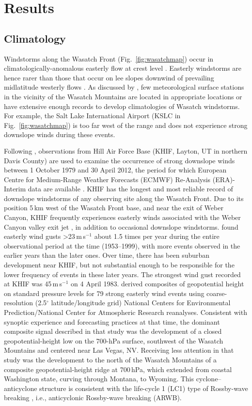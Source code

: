 \documentclass[pdftex,12pt]{article}
\def\mps{m\,s$^{-1}$}
\def\degarc{$^{\circ}$} %
\def\gt{\textgreater}
\begin{document}
\section{Results}
\subsection{Climatology}
Windstorms along the Wasatch Front (Fig.~\ref{fig:wasatchmap}) occur in climatologically-anomalous easterly flow at crest level \citep{Holland2002,Horel2002a}. Easterly windstorms \citep[e.g.,][]{Mass1985-at,Jones2002-la} are hence rarer than those that occur on lee slopes downwind of prevailing midlatitude westerly flows \citep[e.g.,][]{Lilly1972-ak,Zhong2008-rl}. As discussed by \citet{Holland2002}, few meteorological surface stations in the vicinity of the Wasatch Mountains are located in appropriate locations or have extensive enough records to develop climatologies of Wasatch windstorms. For example, the Salt Lake International Airport (KSLC in Fig.~\ref{fig:wasatchmap}) is too far west of the range and does not experience strong downslope winds during these events.

Following \citet{Holland2002}, observations from Hill Air Force Base (KHIF, Layton, UT in northern Davis County) are used to examine the occurrence of strong downslope winds between 1 October 1979 and 30 April 2012, the period for which European Centre for Medium-Range Weather Forecasts (ECMWF) Re-Analysis (ERA)-Interim data are available \citep{Dee2011}. KHIF has the longest and most reliable record of downslope windstorms of any observing site along the Wasatch Front. Due to its position 5\,km west of the Wasatch Front base, and near the exit of Weber Canyon, KHIF frequently experiences easterly winds associated with the Weber Canyon valley exit jet \citep{Chrust2013}, in addition to occasional downslope windstorms. \citet{Holland2002} found easterly wind gusts \gt 23\,\mps{} about 1.5 times per year during the entire observational period at the time (1953--1999), with more events observed in the earlier years than the later ones. Over time, there has been suburban development near KHIF, but not substantial enough to be responsible for the lower frequency of events in these later years. The strongest wind gust recorded at KHIF was 45\,\mps{} on 4 April 1983. \citet{Holland2002} derived composites of geopotential height on standard pressure levels for 79 strong easterly wind events using coarse-resolution (2.5\degarc{} latitude/longitude grid) National Centers for Environmental Prediction/National Center for Atmospheric Research reanalyses. Consistent with synoptic experience and forecasting practices at that time, the dominant composite signal described in that study was the development of a closed geopotential-height low on the 700-hPa surface, southwest of the Wasatch Mountains and centered near Las Vegas, NV. Receiving less attention in that study was the development to the north of the Wasatch Mountains of a composite geopotential-height ridge at 700\,hPa, which extended from coastal Washington state, curving through Montana, to Wyoming. This cyclone--anticyclone structure is consistent with the life-cycle 1 (LC1) type of Rossby-wave breaking \citep{Thorncroft1993}, i.e., anticyclonic Rossby-wave breaking (ARWB).
\end{document}
